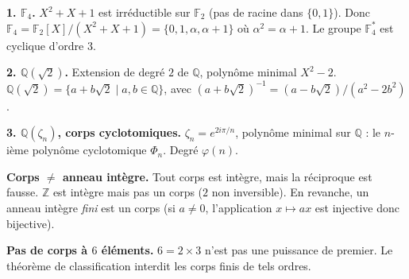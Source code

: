 \decsep{}



\begin{mdframed}[style=exbar]
  \textbf{1. $\mathbb{F}_4$.}\enspace%
  $X^2+X+1$ est irréductible sur $\mathbb{F}_2$ (pas de racine dans $\{0,1\}$).
  Donc $\mathbb{F}_4 = \mathbb{F}_2[X]/(X^2+X+1) = \{0,1,\alpha,\alpha+1\}$
  où $\alpha^2 = \alpha + 1$. Le groupe $\mathbb{F}_4^*$ est cyclique d'ordre $3$.

  \smallskip\noindent
  \textbf{2. $\mathbb{Q}(\sqrt{2})$.}\enspace%
  Extension de degré $2$ de $\mathbb{Q}$, polynôme minimal $X^2-2$.
  $\mathbb{Q}(\sqrt{2}) = \{a+b\sqrt{2} \mid a,b \in \mathbb{Q}\}$,
  avec ${(a+b\sqrt{2})}^{-1} = (a-b\sqrt{2})/(a^2-2b^2)$.

  \smallskip\noindent
  \textbf{3. $\mathbb{Q}(\zeta_n)$, corps cyclotomiques.}\enspace%
  $\zeta_n = e^{2i\pi/n}$, polynôme minimal sur $\mathbb{Q}$ :
  le $n$-ième polynôme cyclotomique $\Phi_n$. Degré $\varphi(n)$.
\end{mdframed}

\vspace{6pt}

\begin{mdframed}[style=cexbar]
  \textbf{Corps $\neq$ anneau intègre.}\enspace%
  Tout corps est intègre, mais la réciproque est fausse.
  $\mathbb{Z}$ est intègre mais pas un corps ($2$ non inversible).
  En revanche, un anneau intègre \emph{fini} est un corps
  (si $a \neq 0$, l'application $x \mapsto ax$ est injective donc bijective).

  \smallskip\noindent
  \textbf{Pas de corps à $6$ éléments.}\enspace%
  $6 = 2 \times 3$ n'est pas une puissance de premier. Le théorème
  de classification interdit les corps finis de tels ordres.
\end{mdframed}

\vspace{6pt}
\exolabel

